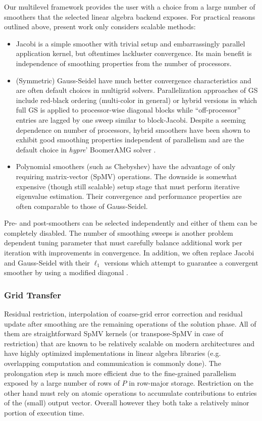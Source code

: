Our multilevel framework provides the user with a choice from a large number of smoothers that the selected linear algebra backend exposes.   For practical reasons outlined above, present work only considers scalable methods:
\begin{itemize}
    \item Jacobi is a simple smoother with trivial setup and embarrassingly parallel application kernel, but oftentimes lackluster convergence.   Its main benefit is independence of smoothing properties from the number of processors.
    \item (Symmetric) Gauss-Seidel have much better convergence characteristics and are often default choices in multigrid solvers.    Parallelization approaches of GS include red-black ordering (multi-color in general) or hybrid versions in which full GS is applied to processor-wise diagonal blocks while ``off-processor'' entries are lagged by one sweep similar to block-Jacobi.   Despite a seeming dependence on number of processors, hybrid smoothers have been shown to exhibit good smoothing properties independent of parallelism \cite{Baker2011} and are the default choice in \textit{hypre}' BoomerAMG solver \cite{Henson2002}.
    \item Polynomial smoothers (such as Chebyshev) have the advantage of only requiring matrix-vector (SpMV) operations.   The downside is somewhat expensive (though still scalable) setup stage that must perform iterative eigenvalue estimation.   Their convergence and performance properties are often comparable to those of Gauss-Seidel.
\end{itemize}
Pre- and post-smoothers can be selected independently and either of them can be completely disabled.   The number of smoothing sweeps is another problem dependent tuning parameter that must carefully balance additional work per iteration with improvements in convergence.   In addition, we often replace Jacobi and Gauss-Seidel with their $\ell_1$ versions which attempt to guarantee a convergent smoother by using a modified diagonal \cite{Baker2011}.

\subsubsection{Grid Transfer}
\label{subsec:par_kernels_apply_transfer}

Residual restriction, interpolation of coarse-grid error correction and residual update after smoothing are the remaining operations of the solution phase.   All of them are straightforward SpMV kernels (or transpose-SpMV in case of restriction) that are known to be relatively scalable on modern architectures and have highly optimized implementations in linear algebra libraries (e.g. overlapping computation and communication is commonly done).   The prolongation step is much more efficient due to the fine-grained parallelism exposed by a large number of rows of $P$ in row-major storage.   Restriction on the other hand must rely on atomic operations to accumulate contributions to entries of the (small) output vector.   Overall however they both take a relatively minor portion of execution time.

